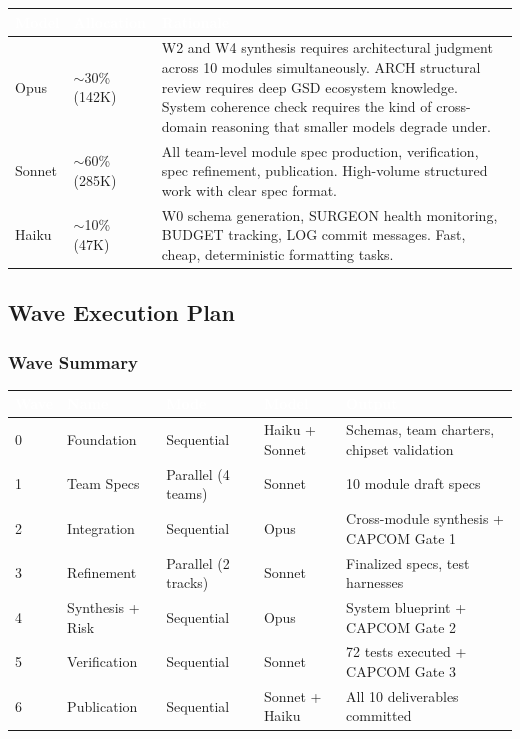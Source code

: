 \documentclass[11pt,letterpaper]{article}
\newcommand{\tableheader}[1]{\textbf{\sffamily\textcolor{white}{#1}}}
\begin{document}
\begin{center}
\begin{tabularx}{\textwidth}{L{2cm}L{2.5cm}X}
\toprule
{}
\tableheader{Model} & \tableheader{Allocation} & \tableheader{Rationale} \\
\midrule
Opus & $\sim$30\% (142K) & W2 and W4 synthesis requires architectural judgment across 10 modules simultaneously. ARCH structural review requires deep GSD ecosystem knowledge. System coherence check requires the kind of cross-domain reasoning that smaller models degrade under. \\
Sonnet & $\sim$60\% (285K) & All team-level module spec production, verification, spec refinement, publication. High-volume structured work with clear spec format. \\
Haiku & $\sim$10\% (47K) & W0 schema generation, SURGEON health monitoring, BUDGET tracking, LOG commit messages. Fast, cheap, deterministic formatting tasks. \\
\end{tabularx}
\end{center}

\subsection{Wave Execution Plan}

\subsubsection{Wave Summary}

\begin{center}
\begin{tabularx}{\textwidth}{C{0.8cm}L{3cm}L{2cm}L{2cm}X}
\toprule
{}
\tableheader{Wave} & \tableheader{Name} & \tableheader{Mode} & \tableheader{Model} & \tableheader{Output} \\
 & Foundation & Sequential & Haiku + Sonnet & Schemas, team charters, chipset validation \\
1 & Team Specs & Parallel (4 teams) & Sonnet & 10 module draft specs \\
2 & Integration & Sequential & Opus & Cross-module synthesis + CAPCOM Gate 1 \\
3 & Refinement & Parallel (2 tracks) & Sonnet & Finalized specs, test harnesses \\
4 & Synthesis + Risk & Sequential & Opus & System blueprint + CAPCOM Gate 2 \\
5 & Verification & Sequential & Sonnet & 72 tests executed + CAPCOM Gate 3 \\
6 & Publication & Sequential & Sonnet + Haiku & All 10 deliverables committed \\
\end{tabularx}
\end{center}
\end{document}
